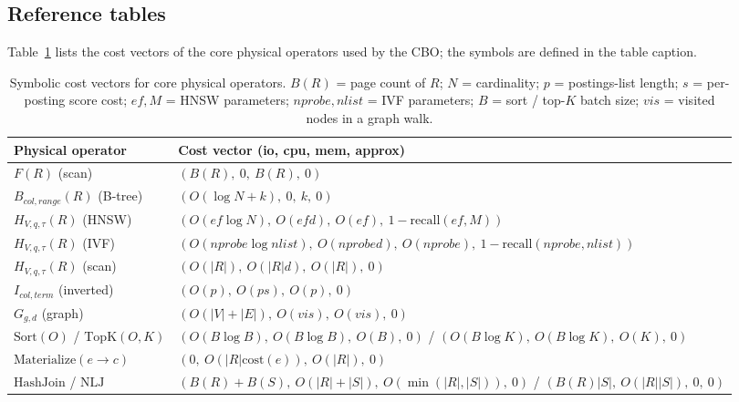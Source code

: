 \documentclass[acmsmall,review,anonymous]{acmart}
\theoremstyle{plain}
\theoremstyle{definition}
\theoremstyle{remark}
\begin{document}
\subsection{Reference tables}\label{app:tables}

Table~\ref{tab:cost-vectors} lists the cost vectors of the core
physical operators used by the CBO; the symbols are defined in
the table caption.

\begin{table}[ht]
\centering
\scriptsize
\setlength{\tabcolsep}{3pt}
\renewcommand{\arraystretch}{0.85}
\begin{tabular}{@{}p{2.6cm}p{10.0cm}@{}}
\toprule
Physical operator & Cost vector (io, cpu, mem, approx) \\
\midrule
$F(R)$ (scan) & $(B(R),\ 0,\ B(R),\ 0)$ \\
$B_{\mathit{col},\mathit{range}}(R)$ (B-tree) & $(O(\log N+k),\ 0,\ k,\ 0)$ \\
$H_{V,q,\tau}(R)$ (HNSW) & $(O(\mathit{ef}\log N),\ O(\mathit{ef}d),\ O(\mathit{ef}),\ 1-\mathrm{recall}(\mathit{ef},M))$ \\
$H_{V,q,\tau}(R)$ (IVF) & $(O(\mathit{nprobe}\log\mathit{nlist}),\ O(\mathit{nprobe}d),\ O(\mathit{nprobe}),\ 1-\mathrm{recall}(\mathit{nprobe},\mathit{nlist}))$ \\
$H_{V,q,\tau}(R)$ (scan) & $(O(|R|),\ O(|R|d),\ O(|R|),\ 0)$ \\
$I_{\mathit{col},\mathit{term}}$ (inverted) & $(O(p),\ O(ps),\ O(p),\ 0)$ \\
$G_{g,d}$ (graph) & $(O(|V|+|E|),\ O(\mathit{vis}),\ O(\mathit{vis}),\ 0)$ \\
$\mathrm{Sort}(O)$ / $\mathrm{TopK}(O,K)$ & $(O(B\log B),\ O(B\log B),\ O(B),\ 0)$ / $(O(B\log K),\ O(B\log K),\ O(K),\ 0)$ \\
$\mathrm{Materialize}(e\to c)$ & $(0,\ O(|R|\mathrm{cost}(e)),\ O(|R|),\ 0)$ \\
$\mathrm{HashJoin}$ / $\mathrm{NLJ}$ & $(B(R)+B(S),\ O(|R|+|S|),\ O(\min(|R|,|S|)),\ 0)$ / $(B(R)|S|,\ O(|R||S|),\ 0,\ 0)$ \\
\bottomrule
\end{tabular}
\caption{Symbolic cost vectors for core physical operators. $B(R)$ = page count of $R$; $N$ = cardinality; $p$ = postings-list length; $s$ = per-posting score cost; $\mathit{ef}, M$ = HNSW parameters; $\mathit{nprobe}, \mathit{nlist}$ = IVF parameters; $B$ = sort / top-$K$ batch size; $\mathit{vis}$ = visited nodes in a graph walk.}
\label{tab:cost-vectors}
\end{table}
\end{document}

